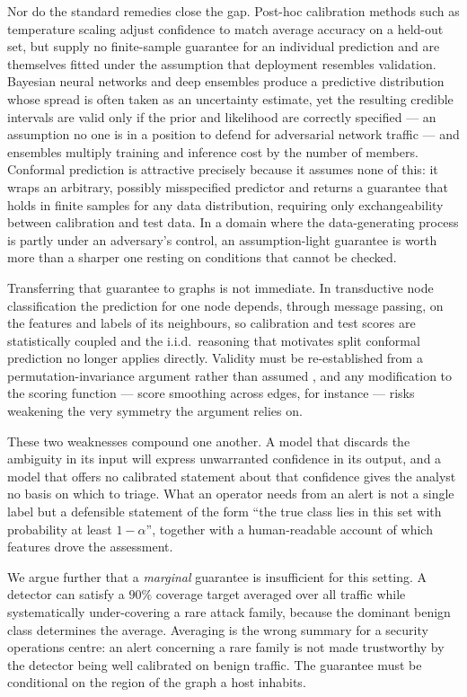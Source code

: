 Nor do the standard remedies close the gap. Post-hoc calibration methods such as
temperature scaling adjust confidence to match average accuracy on a held-out
set, but supply no finite-sample guarantee for an individual prediction and are
themselves fitted under the assumption that deployment resembles validation.
Bayesian neural networks and deep ensembles produce a predictive distribution
whose spread is often taken as an uncertainty estimate, yet the resulting
credible intervals are valid only if the prior and likelihood are correctly
specified — an assumption no one is in a position to defend for adversarial
network traffic — and ensembles multiply training and inference cost by the
number of members. Conformal prediction is attractive precisely because it
assumes none of this: it wraps an arbitrary, possibly misspecified predictor and
returns a guarantee that holds in finite samples for any data distribution,
requiring only exchangeability between calibration and test data. In a domain
where the data-generating process is partly under an adversary's control, an
assumption-light guarantee is worth more than a sharper one resting on
conditions that cannot be checked.

Transferring that guarantee to graphs is not immediate. In transductive node
classification the prediction for one node depends, through message passing, on
the features and labels of its neighbours, so calibration and test scores are
statistically coupled and the i.i.d.\ reasoning that motivates split conformal
prediction no longer applies directly. Validity must be re-established from a
permutation-invariance argument rather than assumed \citep{cfgnn}, and any
modification to the scoring function — score smoothing across edges, for
instance — risks weakening the very symmetry the argument relies on.

These two weaknesses compound one another. A model that discards the ambiguity
in its input will express unwarranted confidence in its output, and a model that
offers no calibrated statement about that confidence gives the analyst no basis
on which to triage. What an operator needs from an alert is not a single label
but a defensible statement of the form ``the true class lies in this set with
probability at least $1-\alpha$'', together with a human-readable account of
which features drove the assessment.

We argue further that a \emph{marginal} guarantee is insufficient for this
setting. A detector can satisfy a $90\%$ coverage target averaged over all
traffic while systematically under-covering a rare attack family, because the
dominant benign class determines the average. Averaging is the wrong summary
for a security operations centre: an alert concerning a rare family is not made
trustworthy by the detector being well calibrated on benign traffic. The
guarantee must be conditional on the region of the graph a host inhabits.

